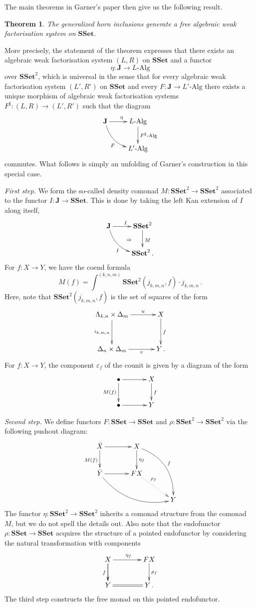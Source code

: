 \documentclass[reqno,10pt,a4paper,oneside]{amsart}
\newcommand{\LAlg}{L\text{-}\mathrm{Alg}}
\newcommand{\LLAlg}{L'\text{-}\mathrm{Alg}}
\newtheorem{theorem}{Theorem}[section]
\theoremstyle{definition}
\newcommand{\co}{\colon}
\newcommand{\SSet}{\mathbf{SSet}}
\begin{document}
 The main theorems in Garner's paper then give us the following result.
 
 \begin{theorem} The generalized horn inclusions generate a free algebraic weak factorisation system on $\SSet$. \end{theorem}
 
 More precisely, the statement of the theorem expresses that there exists an algebraic weak factorisation system
 $(L, R)$ on $\SSet$ and a functor
 \[
 \eta \co \mathbf{J} \to \LAlg
 \]
 over $\SSet^2$, which is universal in the sense that 
 for every algebraic weak factorisation system $(L', R')$ on $\SSet$ and every $F \co \mathbf{J} \to \LLAlg$ there exists a unique
 morphism of algebraic weak factorisation systems $F^\sharp \co (L, R) \to (L', R')$ such that the diagram
 \[
 \xymatrix{
 \mathbf{J} \ar[r]^{\eta} \ar@/_1pc/[dr]_{F} & \LAlg \ar[d]^{F^\sharp\text{-}{\mathrm{Alg}}}  \\
  & \LLAlg}
  \] 
  commutes. What follows is simply an unfolding
 of Garner's construction in this special case. 
 
 \medskip
 
  \noindent
 {\itshape First step.} We form the so-called density comonad $M \co \SSet^2 \to \SSet^2$ 
 associated to the functor $I \co \mathbf{J} \to \SSet$.  This is done by taking the left Kan extension of $I$ along itself, 
 \[
 \xymatrix{
 \mathbf{J} \ar@/_1pc/[dr]_I \ar[r]^I  \ar@{}[dr]|{\quad \Rightarrow}  & \SSet^2 \ar[d]^{M} \\
  & \SSet^2 \, . }
  \]
 For $f \co X \to Y$, we have the coend formula
\[
M(f) = 
\int^{(k,n,m)} \SSet^2( j_{k,m,n}, f )  \cdot j_{k,m,n} \, .
\] 
Here, note that $\SSet^2( j_{k,m,n}, f )$ is  the set of squares of the form
\[
\xymatrix@C=1.2cm@R=1.2cm{
 \Lambda_{k,n} \times \Delta_m \ar[r]^-u \ar[d]_{i_{k,m,n}} & X \ar[d]^f \\
 \Delta_{n} \times \Delta_m \ar[r]_-v   &  Y \, .}
 \]
 For $f \co X \to Y$, the component $\varepsilon_f$ of the counit is given by a diagram of the form
 \[
 \xymatrix@C=1.2cm{
  \bullet \ar[r]  \ar[d]_{M(f)} & X \ar[d]^f \\
  \bullet \ar[r]  & Y }
  \]
 
 
 \medskip
 
 \noindent
 {\itshape Second step.} We define functors $F \co
 \SSet \to \SSet$ and $\rho \co \SSet^2 \to \SSet^2$    via the following pushout diagram:
\[
   \xymatrix@C=1.2cm{
  \bar{X} \ar[r] \ar[d]_{M(f)} & X \ar[d]^{\eta_f} \ar@/^1.5pc/[ddr]^{f} \\
  \bar{Y} \ar[r] \ar@/_1.5pc/[drr]  & FX \ar@{.>}[dr]^-(.3){\rho_f}  \\ 
   & & Y  }
 \]
The functor $\eta \co  \SSet^2 \to \SSet^2$ inherits a comonad structure from the 
 comonad~$M$, but we do not spell  the details out.  Also note that the endofunctor
 $\rho \co \SSet  \to \SSet$ acquires the structure of a pointed endofunctor by considering the natural
 transformation with components
 \[
 \xymatrix@C=1.4cm{
 X \ar[d]_f \ar[r]^{\eta_f} \ar[d] & FX \ar[d]^{\rho_f} \\
 Y \ar@{=}[r]  & Y \, .}
 \]
 The third step constructs the free monad on this pointed endofunctor. 
 
\end{document}
